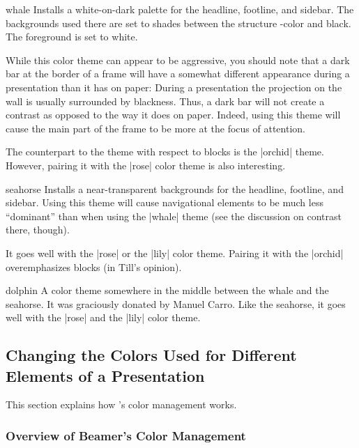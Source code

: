 \begin{colorthemeexample}{whale}
  Installs a white-on-dark palette for the headline, footline, and sidebar. The backgrounds used there are set to shades between the structure \beamer-color and black. The foreground is set to white.

  While this color theme can appear to be aggressive, you should note that a dark bar at the border of a frame will have a somewhat different appearance during a presentation than it has on paper: During a presentation the projection on the wall is usually surrounded by blackness. Thus, a dark bar will not create a contrast as opposed to the way it does on paper. Indeed, using this theme will cause the main part of the frame to be more at the focus of attention.

  The counterpart to the theme with respect to blocks is the |orchid| theme. However, pairing it with the |rose| color theme is also interesting.
\end{colorthemeexample}

\begin{colorthemeexample}{seahorse}
  Installs a near-transparent backgrounds for the headline, footline, and sidebar. Using this theme will cause navigational elements to be much less ``dominant'' than when using the |whale| theme (see the discussion on contrast there, though).

  It goes well with the |rose| or the |lily| color theme. Pairing it with the |orchid| overemphasizes blocks (in Till's opinion).
\end{colorthemeexample}

\begin{colorthemeexample}{dolphin}
  A color theme somewhere in the middle between the whale and the seahorse. It was graciously donated by Manuel Carro. Like the seahorse, it goes well with the |rose| and the |lily| color theme.
\end{colorthemeexample}


\subsection{Changing the Colors Used for Different Elements of a Presentation}

This section explains how \beamer's color management works.

\subsubsection{Overview of Beamer's Color Management}

